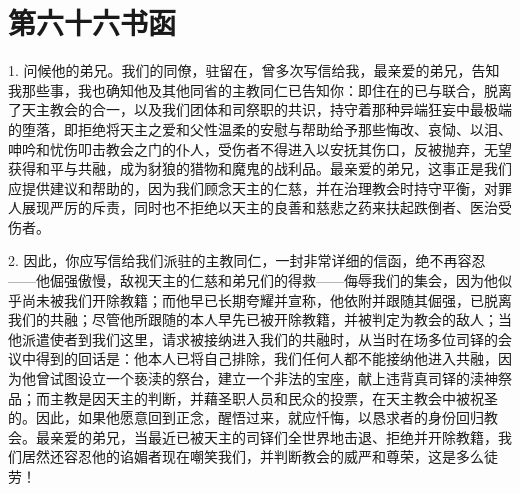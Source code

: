 

\section{第六十六书函}

\par

\par

1. 问候他的弟兄。我们的同僚，驻留在，曾多次写信给我，最亲爱的弟兄，告知我那些事，我也确知他及其他同省的主教同仁已告知你：即住在的已与联合，脱离了天主教会的合一，以及我们团体和司祭职的共识，持守着那种异端狂妄中最极端的堕落，即拒绝将天主之爱和父性温柔的安慰与帮助给予那些悔改、哀恸、以泪、呻吟和忧伤叩击教会之门的仆人，受伤者不得进入以安抚其伤口，反被抛弃，无望获得和平与共融，成为豺狼的猎物和魔鬼的战利品。最亲爱的弟兄，这事正是我们应提供建议和帮助的，因为我们顾念天主的仁慈，并在治理教会时持守平衡，对罪人展现严厉的斥责，同时也不拒绝以天主的良善和慈悲之药来扶起跌倒者、医治受伤者。\par

2. 因此，你应写信给我们派驻的主教同仁，一封非常详细的信函，绝不再容忍——他倔强傲慢，敌视天主的仁慈和弟兄们的得救——侮辱我们的集会，因为他似乎尚未被我们开除教籍；而他早已长期夸耀并宣称，他依附并跟随其倔强，已脱离我们的共融；尽管他所跟随的本人早先已被开除教籍，并被判定为教会的敌人；当他派遣使者到我们这里，请求被接纳进入我们的共融时，从当时在场多位司铎的会议中得到的回话是：他本人已将自己排除，我们任何人都不能接纳他进入共融，因为他曾试图设立一个亵渎的祭台，建立一个非法的宝座，献上违背真司铎的渎神祭品；而主教是因天主的判断，并藉圣职人员和民众的投票，在天主教会中被祝圣的。因此，如果他愿意回到正念，醒悟过来，就应忏悔，以恳求者的身份回归教会。最亲爱的弟兄，当最近已被天主的司铎们全世界地击退、拒绝并开除教籍，我们居然还容忍他的谄媚者现在嘲笑我们，并判断教会的威严和尊荣，这是多么徒劳！\par

